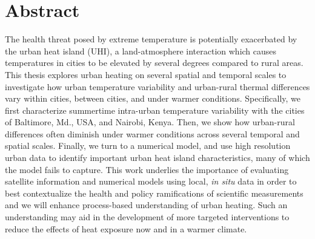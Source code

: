 \chapter*{Abstract}

The health threat posed by extreme temperature is potentially exacerbated by the urban heat island (UHI), a land-atmosphere interaction which causes temperatures in cities to be elevated by several degrees compared to rural areas. 
 This thesis explores urban heating on several spatial and temporal scales to investigate how urban temperature variability and urban-rural thermal differences vary within cities, between cities, and under warmer conditions. 
 Specifically, we first characterize summertime intra-urban temperature variability with the cities of Baltimore, Md., USA, and Nairobi, Kenya. Then, we show how urban-rural differences often diminish under warmer conditions across several temporal and spatial scales. 
 Finally, we turn to a numerical model, and use high resolution urban data to identify important urban heat island characteristics, many of which the model fails to capture.  
 This work underlies the importance of evaluating satellite information and numerical models using local, \textit{in situ} data in order to best contextualize the health and policy ramifications of scientific measurements and we will enhance process-based understanding of urban heating. 
Such an understanding may aid in the development of more targeted interventions to reduce the effects of heat exposure now and in a warmer climate.